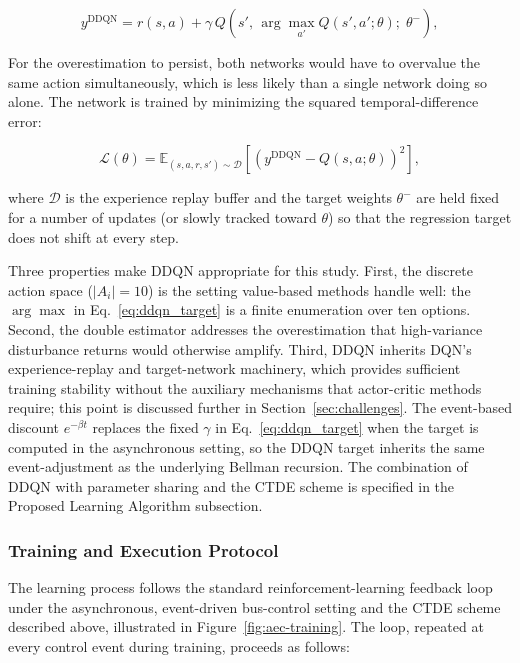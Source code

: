 \begin{equation}
y^{\text{DDQN}} = r(s,a) + \gamma\, Q\!\left(s',\, \arg\max_{a'} Q(s', a'; \theta);\; \theta^-\right),
\label{eq:ddqn_target}
\end{equation}

For the overestimation to persist, both networks would have to overvalue the same action simultaneously, which is less likely than a single network doing so alone. The network is trained by minimizing the squared temporal-difference error:

\begin{equation}
\mathcal{L}(\theta) = \mathbb{E}_{(s,a,r,s') \sim \mathcal{D}} \left[ \left( y^{\text{DDQN}} - Q(s,a;\theta) \right)^2 \right],
\label{eq:ddqn_loss}
\end{equation}

where $\mathcal{D}$ is the experience replay buffer and the target weights $\theta^-$ are held fixed for a number of updates (or slowly tracked toward $\theta$) so that the regression target does not shift at every step.

Three properties make DDQN appropriate for this study. First, the discrete action space ($|A_i| = 10$) is the setting value-based methods handle well: the $\arg\max$ in Eq.~\eqref{eq:ddqn_target} is a finite enumeration over ten options. Second, the double estimator addresses the overestimation that high-variance disturbance returns would otherwise amplify. Third, DDQN inherits DQN's experience-replay and target-network machinery, which provides sufficient training stability without the auxiliary mechanisms that actor-critic methods require; this point is discussed further in Section~\ref{sec:challenges}. The event-based discount $e^{-\beta t}$ replaces the fixed $\gamma$ in Eq.~\eqref{eq:ddqn_target} when the target is computed in the asynchronous setting, so the DDQN target inherits the same event-adjustment as the underlying Bellman recursion. The combination of DDQN with parameter sharing and the CTDE scheme is specified in the Proposed Learning Algorithm subsection.

\subsubsection{Training and Execution Protocol}

The learning process follows the standard reinforcement-learning feedback loop under the asynchronous, event-driven bus-control setting and the CTDE scheme described above, illustrated in Figure~\ref{fig:aec-training}. The loop, repeated at every control event during training, proceeds as follows:

